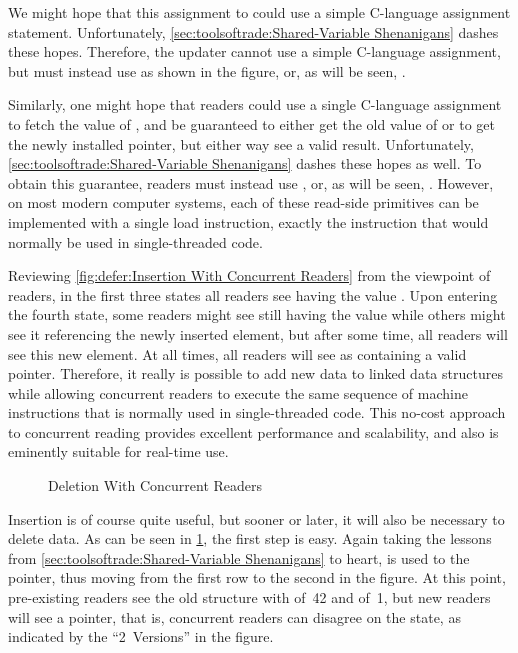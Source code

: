We might hope that this assignment to  could use a simple
C-language assignment statement.
Unfortunately,
\cref{sec:toolsoftrade:Shared-Variable Shenanigans}
dashes these hopes.
Therefore, the updater cannot use a simple C-language assignment, but
must instead use  as shown in the figure,
or, as will be seen, .

Similarly, one might hope that readers could use a single C-language
assignment to fetch the value of , and be guaranteed to either
get the old value of  or to get the newly installed pointer,
but either way see a valid result.
Unfortunately, \cref{sec:toolsoftrade:Shared-Variable Shenanigans}
dashes these hopes as well.
To obtain this guarantee, readers must instead use ,
or, as will be seen, .
However, on most modern computer systems, each of these read-side primitives
can be implemented with a single load instruction, exactly the instruction
that would normally be used in single-threaded code.

Reviewing \cref{fig:defer:Insertion With Concurrent Readers}
from the viewpoint of readers, in the first three states all readers
see  having the value .
Upon entering the fourth state, some readers might see  still
having the value  while others might see it referencing the
newly inserted element, but after some time, all readers will see this
new element.
At all times, all readers will see  as containing a valid pointer.
Therefore, it really is possible to add new data to linked data structures
while allowing concurrent readers to execute the same sequence of machine
instructions that is normally used in single-threaded code.
This no-cost approach to concurrent reading provides excellent performance
and scalability, and also is eminently suitable for real-time use.

\begin{figure}
\centering
{}
\caption{Deletion With Concurrent Readers}
\label{fig:defer:Deletion With Concurrent Readers}
\end{figure}

Insertion is of course quite useful, but sooner or later, it will also
be necessary to delete data.
As can be seen in
\cref{fig:defer:Deletion With Concurrent Readers},
the first step is easy.
Again taking the lessons from
\cref{sec:toolsoftrade:Shared-Variable Shenanigans}
to heart,  is used to  the pointer,
thus moving from the first row to the second in the figure.
At this point, pre-existing readers see the old structure with
 of~42 and  of~1, but new readers will see
a  pointer, that is, concurrent readers can disagree on
the state, as indicated by the ``2~Versions'' in the figure.

